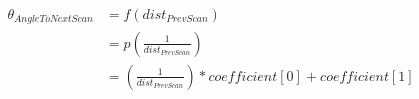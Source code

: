 \begin{equation}
\begin{split}
\theta_{Angle To Next Scan} & = f(dist_{PrevScan}) \\
 & = p(\frac{1}{dist_{PrevScan}}) \\
 & = (\frac{1}{dist_{PrevScan}}) * coefficient[0] + coefficient[1]
\end{split}
\end{equation}